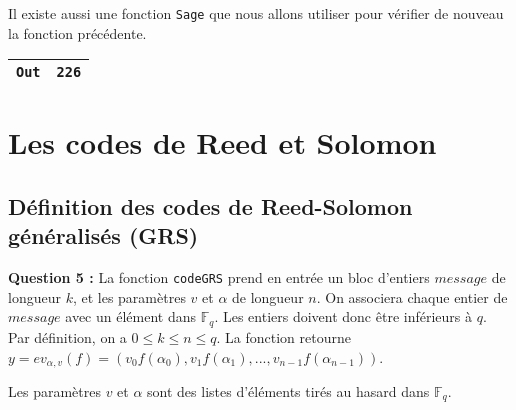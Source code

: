 \documentclass[titlepage]{article}
\begin{document}
            Il existe aussi une fonction \texttt{Sage} que nous allons utiliser pour vérifier de nouveau la fonction précédente.

            

            \begin{tabularx}{12cm}{|p{0.60cm}|X|}
                \hline
                \texttt{Out}
                &
                \texttt{226}
                \\
                \hline
            \end{tabularx}
            \bigbreak
    
    \section{Les codes de Reed et Solomon}
        \subsection{Définition des codes de Reed-Solomon \\ généralisés (GRS)}

        \textbf{Question 5 :}
        La fonction \texttt{codeGRS} prend en entrée un bloc d'entiers $message$ de longueur $k$, et les paramètres $v$ et $\alpha$ de longueur $n$.
        On associera chaque entier de $message$ avec un élément dans $\mathbb{F}_q$. Les entiers doivent donc être inférieurs à $q$.
        Par définition, on a $0 \leqslant k \leqslant n \leqslant q$. La fonction retourne $y = ev_{\alpha,v}(f) = (v_0f(\alpha_0), v_1f(\alpha_1), ..., v_{n-1}f(\alpha_{n-1}))$.

        Les paramètres $v$ et $\alpha$ sont des listes d'éléments tirés au hasard dans $\mathbb{F}_q$.

        
\end{document}
